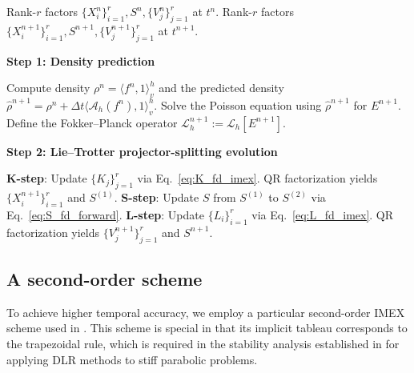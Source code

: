\documentclass[]{article}
\newcommand{\AlgPhase}[1]{%
  \vspace{0.3em} %
  \Statex \textbf{#1} %
  \vspace{0.1em} %
}
\numberwithin{equation}{section}
\begin{document}
\begin{algorithm}
\caption{First-order low-rank IMEX scheme}
\label{alg:first_order}
\begin{algorithmic}[1]
\Require Rank-$r$ factors $\{X^n_i\}_{i=1}^{r}, S^n, \{V^n_j\}_{j=1}^{r}$ at $t^n$.
\Ensure Rank-$r$ factors $\{X^{n+1}_i\}_{i=1}^{r}, S^{n+1}, \{V^{n+1}_j\}_{j=1}^{r}$ at $t^{n+1}$.

\AlgPhase{Step 1: Density prediction}
    \State Compute density $\rho^n = \langle f^n, 1 \rangle_v^h$ and the predicted density $\hat{\rho}^{n+1} = \rho^n + \Delta t \langle \mathcal{A}_h(f^n), 1 \rangle_v^h$.
    \State Solve the Poisson equation using $\hat{\rho}^{n+1}$ for $E^{n+1}$.
    \State Define the Fokker--Planck operator $\mathcal{L}_h^{n+1} := \mathcal{L}_h[E^{n+1}]$.

\AlgPhase{Step 2: Lie--Trotter projector-splitting evolution}
    \State \textbf{K-step}: Update $\{K_j\}_{j=1}^{r}$ via Eq.~\eqref{eq:K_fd_imex}.
    \State {} QR factorization yields $\{X^{n+1}_i\}_{i=1}^{r}$ and $S^{(1)}$.
    \State \textbf{S-step}: Update $S$ from $S^{(1)}$ to $S^{(2)}$ via Eq.~\eqref{eq:S_fd_forward}.
    \State \textbf{L-step}: Update $\{L_i\}_{i=1}^{r}$ via Eq.~\eqref{eq:L_fd_imex}.
    \State {} QR factorization yields $\{V^{n+1}_j\}_{j=1}^{r}$ and $S^{n+1}$.
\end{algorithmic}
\end{algorithm}

\subsection{A second-order scheme}
\label{sec:second_order_schemes}

To achieve higher temporal accuracy, we employ a particular second-order IMEX scheme used in \cite{filbet2010class}. This scheme is special in that its implicit tableau corresponds to the trapezoidal rule, which is required in the stability analysis established in
\cite{zhang2025stability} for applying DLR methods to stiff parabolic problems. 
\end{document}
